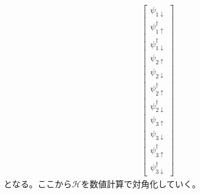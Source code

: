 \documentclass{jarticle}
\begin{document}
\begin{align}
\begin{bmatrix}
 \psi_{1\downarrow} \\ 
 \psi_{1\uparrow}^\dagger \\ 
 \psi_{1\downarrow}^\dagger \\ 
 \psi_{2\uparrow} \\ 
 \psi_{2\downarrow} \\ 
 \psi_{2\uparrow}^\dagger \\ 
 \psi_{2\downarrow}^\dagger \\ 
 \psi_{3\uparrow} \\ 
 \psi_{3\downarrow} \\ 
 \psi_{3\uparrow}^\dagger \\ 
 \psi_{3\downarrow}^\dagger
 \end{bmatrix} 
\end{align}
となる。ここから$\mathcal{H}$を数値計算で対角化していく。
\end{document}
